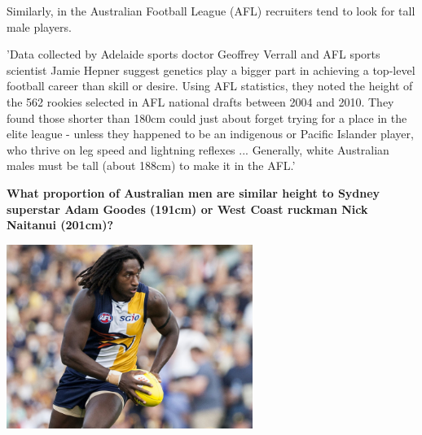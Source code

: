 \documentclass[t,xcolor=pdftex,dvipsnames,table]{beamer}\usepackage[]{graphicx}\usepackage[]{color}
\begin{document}
\begin{frame}[fragile]{}

Similarly, in the Australian Football League (AFL) recruiters tend to look for tall male players.

\vspace{.5cm}
'Data collected by Adelaide sports doctor Geoffrey Verrall and AFL sports scientist Jamie Hepner suggest genetics play a bigger part in achieving a top-level football career than skill or desire. Using AFL statistics, they noted the height of the 562 rookies selected in AFL national drafts between 2004 and 2010. They found those shorter than 180cm could just about forget trying for a place in the elite league - unless they happened to be an indigenous or Pacific Islander player, who thrive on leg speed and lightning reflexes ... Generally, white Australian males must be tall (about 188cm) to  make it in the AFL.'
\href{http://www.heraldsun.com.au/sport/afl/size-matters-at-afl-level/story-e6frf9jf-1226650225771}{}
\end{frame}


\begin{frame}{}

{\bf What proportion of Australian men are similar height to Sydney superstar Adam Goodes (191cm) or West Coast ruckman Nick Naitanui (201cm)?}

\begin{center}
\includegraphics[height=6cm]{../images/NicN.jpg}
\end{center}

\href{http://www.sbs.com.au/news/sites/sbs.com.au.news/files/images/1/5/15Apr_NicNaitanui_800x600.jpg}{}
\end{frame}
\end{document}
